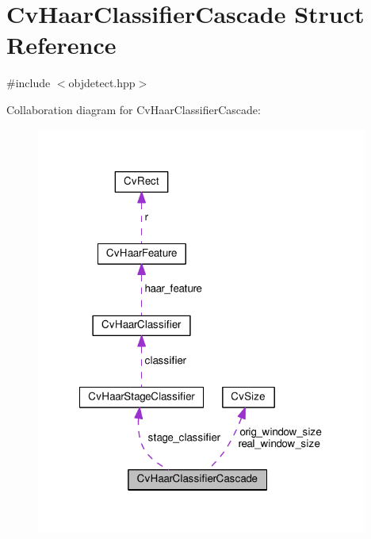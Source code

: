 \hypertarget{structCvHaarClassifierCascade}{\section{Cv\-Haar\-Classifier\-Cascade Struct Reference}
\label{structCvHaarClassifierCascade}
}


{\ttfamily \#include $<$objdetect.\-hpp$>$}



Collaboration diagram for Cv\-Haar\-Classifier\-Cascade\-:\nopagebreak
\begin{figure}[H]
\begin{center}
\leavevmode
\includegraphics[width=309pt]{structCvHaarClassifierCascade__coll__graph}
\end{center}
\end{figure}
